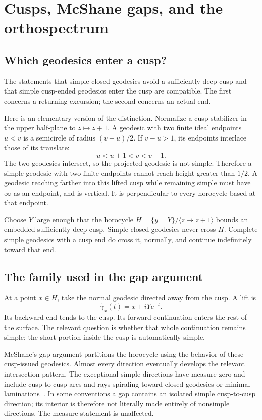 \section{Cusps, McShane gaps, and the orthospectrum}
\label{sec:cusps}

\subsection{Which geodesics enter a cusp?}

The statements that simple closed geodesics avoid a sufficiently deep cusp
and that simple cusp-ended geodesics enter the cusp are compatible. The
first concerns a returning excursion; the second concerns an actual end.

Here is an elementary version of the distinction. Normalize a cusp
stabilizer in the upper half-plane to $z\mapsto z+1$. A geodesic with two
finite ideal endpoints $u<v$ is a semicircle of radius $(v-u)/2$. If
$v-u>1$, its endpoints interlace those of its translate:
\[
 u<u+1<v<v+1.
\]
The two geodesics intersect, so the projected geodesic is not simple.
Therefore a simple geodesic with two finite endpoints cannot reach height
greater than $1/2$. A geodesic reaching farther into this lifted cusp
while remaining simple must have $\infty$ as an endpoint, and is vertical.
It is perpendicular to every horocycle based at that endpoint.

Choose $Y$ large enough that the horocycle $H=\{y=Y\}/\langle z\mapsto
z+1\rangle$ bounds an embedded sufficiently deep cusp. Simple closed
geodesics never cross $H$. Complete simple geodesics with a cusp end do
cross it, normally, and continue indefinitely toward that end.

\subsection{The family used in the gap argument}

At a point $x\in H$, take the normal geodesic directed away from the
cusp. A lift is
\begin{equation}
 \widetilde\gamma_x(t)=x+iYe^{-t}.
 \label{eq:cuspray}
\end{equation}
Its backward end tends to the cusp. Its forward continuation enters the
rest of the surface. The relevant question is whether that whole
continuation remains simple; the short portion inside the cusp is
automatically simple.

McShane's gap argument partitions the horocycle using the behavior of
these cusp-issued geodesics. Almost every direction eventually develops
the relevant intersection pattern. The exceptional simple directions
have measure zero and include cusp-to-cusp arcs and rays spiraling toward
closed geodesics or minimal laminations~\cite{McShane,McShanePants}.
In some conventions a gap contains an isolated simple cusp-to-cusp
direction; its interior is therefore not literally made entirely of
nonsimple directions. The measure statement is unaffected.


